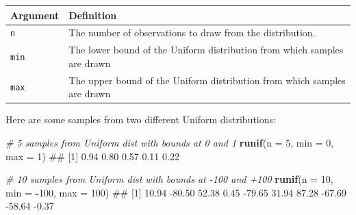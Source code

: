 \documentclass[]{book}
\newenvironment{Shaded}{\begin{snugshade}}{\end{snugshade}}
\newcommand{\KeywordTok}[1]{\textcolor[rgb]{0.13,0.29,0.53}{\textbf{#1}}}
\newcommand{\DataTypeTok}[1]{\textcolor[rgb]{0.13,0.29,0.53}{#1}}
\newcommand{\DecValTok}[1]{\textcolor[rgb]{0.00,0.00,0.81}{#1}}
\newcommand{\CommentTok}[1]{\textcolor[rgb]{0.56,0.35,0.01}{\textit{#1}}}
\newcommand{\OperatorTok}[1]{\textcolor[rgb]{0.81,0.36,0.00}{\textbf{#1}}}
\newcommand{\NormalTok}[1]{#1}
\theoremstyle{definition}
\theoremstyle{definition}
\theoremstyle{remark}
\begin{document}
\begin{longtable}[]{@{}ll@{}}
\toprule
\begin{minipage}[b]{0.14\columnwidth}\raggedright\strut
Argument\strut
\end{minipage} & \begin{minipage}[b]{0.61\columnwidth}\raggedright\strut
Definition\strut
\end{minipage}\tabularnewline
\midrule
\endhead
\begin{minipage}[t]{0.14\columnwidth}\raggedright\strut
\texttt{n}\strut
\end{minipage} & \begin{minipage}[t]{0.61\columnwidth}\raggedright\strut
The number of observations to draw from the distribution.\strut
\end{minipage}\tabularnewline
\begin{minipage}[t]{0.14\columnwidth}\raggedright\strut
\texttt{min}\strut
\end{minipage} & \begin{minipage}[t]{0.61\columnwidth}\raggedright\strut
The lower bound of the Uniform distribution from which samples are
drawn\strut
\end{minipage}\tabularnewline
\begin{minipage}[t]{0.14\columnwidth}\raggedright\strut
\texttt{max}\strut
\end{minipage} & \begin{minipage}[t]{0.61\columnwidth}\raggedright\strut
The upper bound of the Uniform distribution from which samples are
drawn\strut
\end{minipage}\tabularnewline
\bottomrule
\end{longtable}

Here are some samples from two different Uniform distributions:

\begin{Shaded}
\begin{Highlighting}[]
\CommentTok{# 5 samples from Uniform dist with bounds at 0 and 1}
\KeywordTok{runif}\NormalTok{(}\DataTypeTok{n =} \DecValTok{5}\NormalTok{, }\DataTypeTok{min =} \DecValTok{0}\NormalTok{, }\DataTypeTok{max =} \DecValTok{1}\NormalTok{)}
\NormalTok{## [1] 0.94 0.80 0.57 0.11 0.22}

\CommentTok{# 10 samples from Uniform dist with bounds at -100 and +100}
\KeywordTok{runif}\NormalTok{(}\DataTypeTok{n =} \DecValTok{10}\NormalTok{, }\DataTypeTok{min =} \OperatorTok{-}\DecValTok{100}\NormalTok{, }\DataTypeTok{max =} \DecValTok{100}\NormalTok{)}
\NormalTok{##  [1]  10.94 -80.50  52.38   0.45 -79.65  31.94  87.28 -67.69 -58.64  -0.37}
\end{Highlighting}
\end{Shaded}
\end{document}
